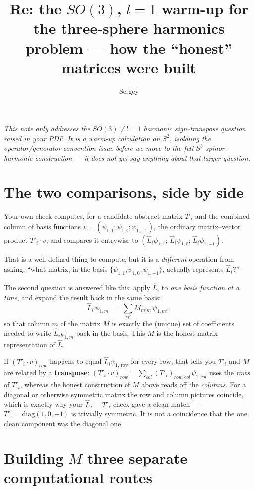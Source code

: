 \documentclass[11pt]{article}
\title{Re: the $SO(3)$, $l=1$ warm-up for the three-sphere harmonics problem --- how the ``honest'' matrices were built}
\author{Sergey}
\date{}
\begin{document}
\maketitle

\noindent\emph{This note only addresses the $SO(3)$ / $l=1$ harmonic
sign--transpose question raised in your PDF. It is a warm-up calculation on
$S^2$, isolating the operator/generator convention issue before we move to
the full $S^3$ spinor-harmonic construction --- it does not yet say
anything about that larger question.}

\section{The two comparisons, side by side}

Your own check computes, for a candidate abstract matrix $T'_i$ and the
combined column of basis functions $v = (\psi_{1,1};\psi_{1,0};\psi_{1,-1})$,
the ordinary matrix--vector product $T'_i \cdot v$, and compares it
entrywise to $(\hat L_i\psi_{1,1};\,\hat L_i\psi_{1,0};\,\hat L_i\psi_{1,-1})$.

That is a well-defined thing to compute, but it is a \emph{different}
operation from asking: ``what matrix, in the basis
$\{\psi_{1,1},\psi_{1,0},\psi_{1,-1}\}$, actually represents $\hat L_i$?''

The second question is answered like this: apply $\hat L_i$ to
\emph{one basis function at a time}, and expand the result back in the same
basis:
\[
  \hat L_i\,\psi_{1,m} \;=\; \sum_{m'} M_{m'm}\,\psi_{1,m'} ,
\]
so that column $m$ of the matrix $M$ is exactly the (unique) set of
coefficients needed to write $\hat L_i\psi_{1,m}$ back in the basis. This
$M$ is the honest matrix representation of $\hat L_i$.

If $(T'_i\cdot v)_{row}$ happens to equal $\hat L_i\psi_{1,\,\mathrm{row}}$
for every row, that tells you $T'_i$ and $M$ are related by a
\textbf{transpose}: $(T'_i \cdot v)_{row} = \sum_{col} (T'_i)_{row,col}\,\psi_{1,col}$
uses the \emph{rows} of $T'_i$, whereas the honest construction of $M$
above reads off the \emph{columns}. For a diagonal or otherwise symmetric
matrix the row and column pictures coincide, which is exactly why your
$\hat L_z = T'_z$ check gave a clean match --- $T'_z=\mathrm{diag}(1,0,-1)$
is trivially symmetric. It is not a coincidence that the one clean
component was the diagonal one.

\section{Building $M$ three separate computational routes}
\end{document}
